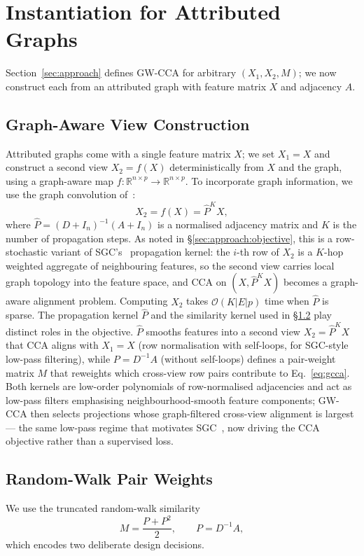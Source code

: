 \documentclass{article}
\begin{document}
\section{Instantiation for Attributed Graphs}
\label{sec:apply}

Section~\ref{sec:approach} defines GW-CCA for arbitrary $(X_1, X_2, M)$;
we now construct each from an attributed graph with feature matrix $X$
and adjacency $A$.

\subsection{Graph-Aware View Construction}
Attributed graphs come with a single feature matrix $X$; we set $X_1 = X$
and construct a second view $X_2 = f(X)$ deterministically from $X$ and the
graph, using a graph-aware map
$f : \mathbb{R}^{n \times p} \rightarrow \mathbb{R}^{n \times p}$. To
incorporate graph information, we use the graph convolution
of~\citet{wu2019simplifying}:
\begin{equation}\label{eq:f}
X_2 = f(X) = \widehat{P}^K X,
\end{equation}
where $\widehat{P} = (D + I_n)^{-1}(A + I_n)$ is a normalised adjacency matrix and
$K$ is the number of propagation steps. As noted in
\S\ref{sec:approach:objective}, this is a row-stochastic variant of
SGC's~\citep{wu2019simplifying} propagation kernel: the $i$-th row of
$X_2$ is a $K$-hop weighted aggregate
of neighbouring features, so the second view carries local graph topology
into the feature space, and CCA on $(X, \widehat{P}^K X)$ becomes a
graph-aware alignment problem. Computing $X_2$ takes $\mathcal{O}(K|E|p)$
time when $\widehat{P}$ is sparse. The propagation kernel $\widehat{P}$
and the similarity kernel used in \S\ref{sec:apply:M} play distinct
roles in the objective. $\widehat{P}$ smooths features into a second
view $X_2 = \widehat{P}^K X$ that CCA aligns with $X_1 = X$ (row
normalisation with self-loops, for SGC-style low-pass filtering), while
$P = D^{-1}A$ (without self-loops) defines a pair-weight matrix $M$
that reweights which cross-view row pairs contribute to
Eq.~\ref{eq:gcca}. Both kernels are low-order polynomials of
row-normalised adjacencies and act as low-pass filters emphasising
neighbourhood-smooth feature components; GW-CCA then selects
projections whose graph-filtered cross-view alignment is largest ---
the same low-pass regime that motivates
SGC~\citep{wu2019simplifying}, now driving the CCA objective rather
than a supervised loss.

\subsection{Random-Walk Pair Weights}
\label{sec:apply:M}
We use the truncated random-walk similarity
\begin{equation}\label{eq:M}
M = \frac{P + P^2}{2}, \qquad P = D^{-1}A,
\end{equation}
which encodes two deliberate design decisions.
\end{document}
